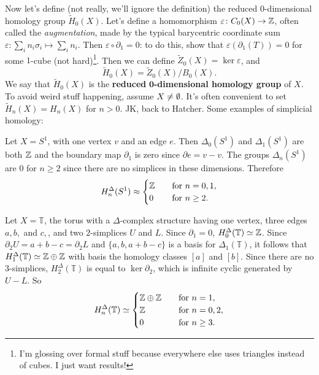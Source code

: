 Now let's define (not really, we'll ignore the definition) the reduced $0$-dimensional homology group $\widetilde H_0(X)$. Let's define a homomorphism $\varepsilon \colon C_0(X) \to \mathbb{Z}$, often called the \emph{augmentation}, made by the typical barycentric coordinate sum $\varepsilon \colon \sum_{i}^{} n_i \sigma_i \mapsto \sum_{i}^{} n_i $. Then $\varepsilon \circ \partial_1=0 $: to do this, show that $\varepsilon (\partial_1(T))=0 $ for some $1$-cube (not hard)\footnote{I'm glossing over formal stuff because everywhere else uses triangles instead of cubes. I just want results!}. Then we can define $\widetilde Z_0(X)=\ker \varepsilon $, and \[
    \widetilde H_0(X)=\widetilde Z_0(X)/B_0(X).
\] We say that $\widetilde H_0(X)$ is the \textbf{reduced} $\mathbf{0}$\textbf{-dimensional homology group} of $X$. To avoid weird stuff happening, assume $X\neq \emptyset$. It's often convenient to set $\widetilde H_n (X)=H_n (X)$ for $n>0$.
\orbreak
JK, back to Hatcher. Some examples of simplicial homology:
\begin{example}
    Let $X=S^{1} $, with one vertex $v$ and an edge $e$. Then $\Delta_0(S^{1} )$ and $\Delta_1(S^{1} ) $ are both $\mathbb{Z}$ and the boundary map $\partial_1 $ is zero since $\partial e= v-v$. The groups $\Delta _n (S^{1} )$ are $0$ for $n\geq 2$ since there are no simplices in these dimensions. Therefore \[
        H_n ^{\Delta }(S^{1} )\approx
    \begin{cases}
        \mathbb{Z}\quad & \text{for} \ n=0,1,\\
        0 \quad & \text{for} \ n\geq 2.
    \end{cases}
    \] 
\end{example}
\begin{example}
    Let $X=\mathbb{T}$, the torus with a $\Delta $-complex structure having one vertex, three edges $a,b,$ and $c,$, and two $2$-simplices $U$ and $L$. Since $\partial_1=0 $, $H_0^{\Delta }(\mathbb{T})\simeq\mathbb{Z}$. Since $\partial_2U=a+b-c=\partial_2L  $ and $\{a,b,a+b-c\} $ is a basis for $\Delta_1(\mathbb{T}) $, it follows that $H_1^{\Delta }(\mathbb{T})\simeq\mathbb{Z}\oplus \mathbb{Z}$ with basis the homology classes $[a]$ and $[b]$. Since there are no $3$-simplices, $H_2^{\Delta }(\mathbb{T})$ is equal to $\ker \partial_2 $, which is infinite cyclic generated by $U-L$. So
    \[
        H_n ^{\Delta }(\mathbb{T})\simeq
        \begin{cases}
            \mathbb{Z}\oplus \mathbb{Z} \quad &\text{for} \ n=1,\\
            \mathbb{Z} \quad &\text{for} \ n=0,2,\\
            0 \quad &\text{for} \ n\geq 3.
        \end{cases}
    \] 
\end{example}
